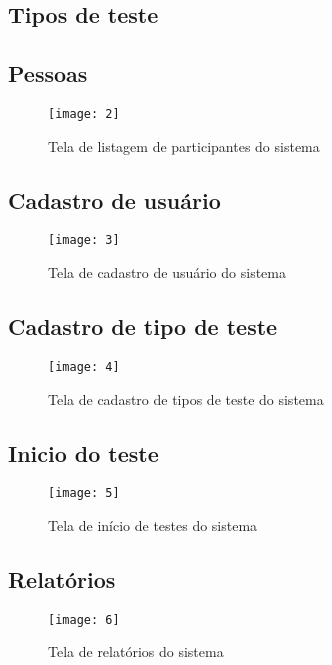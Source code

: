 \subsection{Tipos de teste}

\subsection{Pessoas}

\begin{figure}[h]
  \caption{Tela de listagem de participantes do sistema}
  \centering
  \texttt{[image: 2]}
\end{figure}
\FloatBarrier

\subsection{Cadastro de usuário}

\begin{figure}[h]
  \caption{Tela de cadastro de usuário do sistema}
  \centering
  \texttt{[image: 3]}
\end{figure}
\FloatBarrier

\subsection{Cadastro de tipo de teste}

\begin{figure}[h]
  \caption{Tela de cadastro de tipos de teste do sistema}
  \centering
  \texttt{[image: 4]}
\end{figure}
\FloatBarrier

\subsection{Inicio do teste}

\begin{figure}[h]
  \caption{Tela de início de testes do sistema}
  \centering
  \texttt{[image: 5]}
\end{figure}
\FloatBarrier

\subsection{Relatórios}

\begin{figure}[h]
  \caption{Tela de relatórios do sistema}
  \centering
  \texttt{[image: 6]}
\end{figure}
\FloatBarrier

